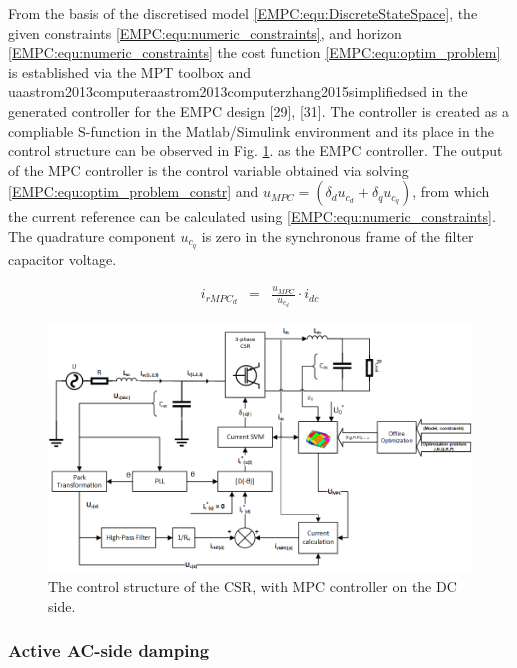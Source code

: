     From the basis of the discretised model \ref{EMPC:equ:DiscreteStateSpace}, the given constraints \ref{EMPC:equ:numeric_constraints}, and horizon \ref{EMPC:equ:numeric_constraints} the cost function \ref{EMPC:equ:optim_problem} is established via the MPT toolbox \cite{MPT3} and uaastrom2013computeraastrom2013computerzhang2015simplifiedsed in the generated controller for the EMPC design [29], [31]. The controller is created as a compliable S-function in the Matlab/Simulink environment and its place in the control structure can be observed in Fig. \ref{EMPC:fig:MPCStructure}. as the EMPC controller.
    The output of the MPC controller is the control variable obtained via solving \ref{EMPC:equ:optim_problem_constr} and
    $u_{MPC}=(\delta_du_{c_d}+\delta_qu_{c_q})$, from which the current reference can be calculated using \ref{EMPC:equ:numeric_constraints}. The quadrature component $u_{c_q}$ is zero in the synchronous frame of the filter capacitor voltage.


    \begin{equation}
        \begin{array}{rcl}
            i_{rMPC_{d}}&=&\frac{u_{MPC}}{u_{c_d}}\cdot i_{dc}
        \end{array}
        \label{EMPC:equ:direct_controlval}
    \end{equation}

    \begin{figure}[!ht]
        \centering
        \includegraphics[width=\textwidth]{EMPC_PNG_Pics/MPCStructure.png}
        \caption{The control structure of the CSR, with MPC controller on the DC side.}
        \label{EMPC:fig:MPCStructure}
    \end{figure}

\subsubsection{Active AC-side damping}\label{EMPC:sec:ACdamping}

